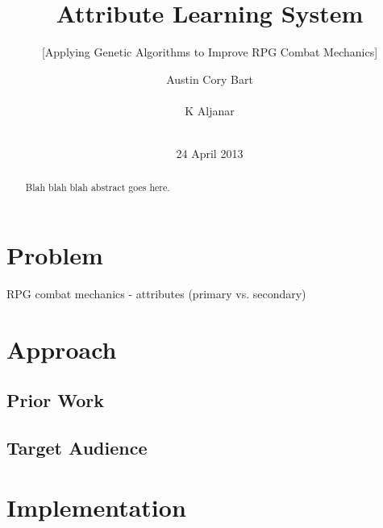 \documentclass{acm_proc_article-sp}
\begin{document}
\title{Attribute Learning System}
\subtitle{[Applying Genetic Algorithms to Improve RPG Combat Mechanics]} %



\author{
\alignauthor
Austin Cory Bart\\
       \\
\alignauthor
K Aljanar\\
       \\
\alignauthor
}

\date{24 April 2013}

\maketitle
\begin{abstract}
Blah blah blah abstract goes here.
\end{abstract}




\section{Problem}
    
    RPG combat mechanics - attributes (primary vs. secondary)
	
\section{Approach}

    \subsection{Prior Work}

    \subsection{Target Audience}

\section{Implementation}
\end{document}
